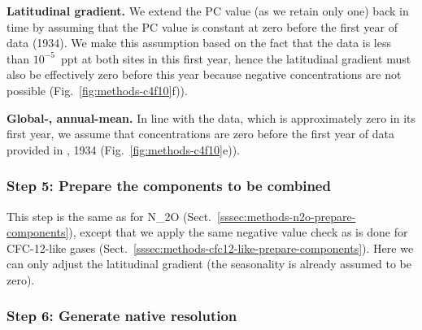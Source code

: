 \textbf{Latitudinal gradient.}
We extend the PC value (as we retain only one) back in time by
assuming that the PC value is constant at zero
before the first year of \citet{droste_pfcs_2020} data (1934).
We make this assumption based on the fact that the \citet{droste_pfcs_2020} data
is less than $10^{-5}$~ppt at both sites in this first year,
hence the latitudinal gradient must also be effectively zero before this year
because negative concentrations are not possible (Fig.~\ref{fig:methods-c4f10}f)).

\textbf{Global-, annual-mean.}
In line with the \citet{droste_pfcs_2020} data,
which is approximately zero in its first year,
we assume that concentrations are zero before the first year of data provided in \citet{droste_pfcs_2020}, 1934
(Fig.~\ref{fig:methods-c4f10}e)).


\subsubsection{Step 5: Prepare the components to be combined}
\label{sssec:methods-c4f10-like-prepare-components}

This step is the same as for N_2O (Sect.~\ref{sssec:methods-n2o-prepare-components}),
except that we apply the same negative value check as is done for CFC-12-like gases
(Sect.~\ref{sssec:methods-cfc12-like-prepare-components}).
Here we can only adjust the latitudinal gradient
(the seasonality is already assumed to be zero).

\subsubsection{Step 6: Generate native resolution}
\label{sssec:methods-c4f10-like-generate-native-resolution}


